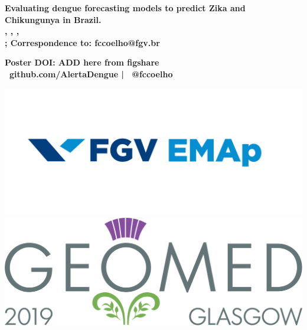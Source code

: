 \documentclass[a0,portrait]{a0poster}
\begin{document}


\begin{minipage}[b]{0.75\linewidth}
\VeryHuge \color{NavyBlue} \textbf{Evaluating dengue forecasting models to 
predict Zika and Chikungunya in Brazil.}
\color{Black}\\[0.4cm] 
\Large \textbf{
, 
, 
, 
} 
\\
\vspace{1cm}
\large \textbf{
; 
\large \textbf{Correspondence to: fccoelho@fgv.br}}
\begin{center}
    \large \textbf{Poster DOI: ADD here from figshare \\ \faGithub \ 
github.com/AlertaDengue | \faTwitter \ @fccoelho}
\end{center}
\end{minipage}
%
\begin{minipage}[b]{0.25\linewidth}
\begin{center}
\includegraphics[width=15cm]{figures/Marca_FGV_EMAp.png}\\ 
\includegraphics[width=16cm]{figures/geomed.png}\\
\end{center}
\end{minipage}
\end{document}
